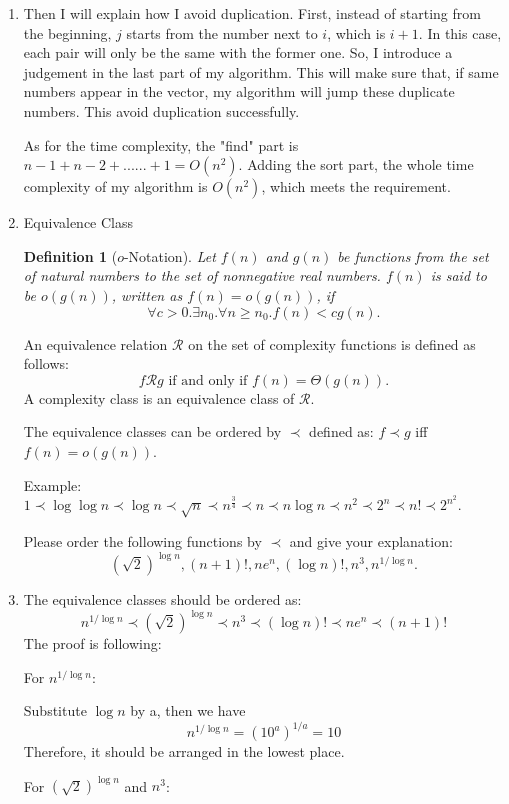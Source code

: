 \documentclass[12pt,a4paper]{article}
\makeatletter
\newtheorem*{solution}{Solution}
\newtheorem{definition}{Definition}
\theoremstyle{definition}
\renewenvironment{solution}[1][Solution] {\par\pushQED{\qed}\normalfont\topsep6\p@\@plus6\p@\relax\trivlist\item[\hskip\labelsep\bfseries#1\@addpunct{.}]\ignorespaces}{\popQED\endtrivlist\@endpefalse} \makeatother
\makeatother
\begin{document}
\begin{enumerate}
\begin{solution}
Then I will explain how I avoid duplication. First, instead of starting from the beginning, $j$ starts from the number next to $i$, which is $i + 1$. In this case, each pair will only be the same with the former one. So, I introduce a judgement in the last part of my algorithm. This will make sure that, if same numbers appear in the vector, my algorithm will jump these duplicate numbers. This avoid duplication successfully.

As for the time complexity, the "find" part is $n-1 + n-2 + ...... + 1 = O(n^2)$. Adding the sort part, the whole time complexity of my algorithm is $O(n^2)$, which meets the requirement.
\end{solution}

\item Equivalence Class

\begin{definition}[$o$-Notation]
Let $f(n)$ and $g(n)$ be functions from the set of natural numbers to the set of nonnegative real numbers. $f(n)$ is said to be $o(g(n))$, written as $f(n)=o(g(n))$, if
$$\forall c>0.\exists n_{0}.\forall n\ge n_{0}.f(n)<c g(n).$$
\end{definition}

An equivalence relation $\mathcal{R}$ on the set of complexity functions is defined as follows: $$f\mathcal{R}g \mbox{ if and only if }
f(n)=\Theta(g(n)).$$ A complexity class is an equivalence class of $\mathcal{R}$.

The equivalence classes can be ordered by $\prec$ defined as: $f\prec g$ iff $f(n)=o(g(n))$.

{\color{purple}Example: $1 \prec \log \log n \prec \log n \prec \sqrt{n} \prec n^{\frac{3}{4}} \prec n \prec n \log n \prec n^2 \prec 2^n \prec n! \prec 2^{n^2}$.}

Please order the following functions by $\prec$ and give your explanation: $$(\sqrt{2})^{\log n}, (n+1)!, 
ne^n, (\log n)!, n^3,  n^{1/\log n}.$$




\begin{solution}
The equivalence classes should be ordered as: $$n^{1/\log n} \prec (\sqrt{2})^{\log n} \prec n^3 \prec (\log n)! \prec ne^n \prec (n+1)!$$ The proof is following:

For $n^{1/\log n}$:

    Substitute $\log n$ by a, then we have $$n^{1/\log n}=(10^a)^{1/a}=10$$
    Therefore, it should be arranged in the lowest place.

For $(\sqrt{2})^{\log n}$ and $n^3$:


\end{solution}
\end{enumerate}
\end{document}
